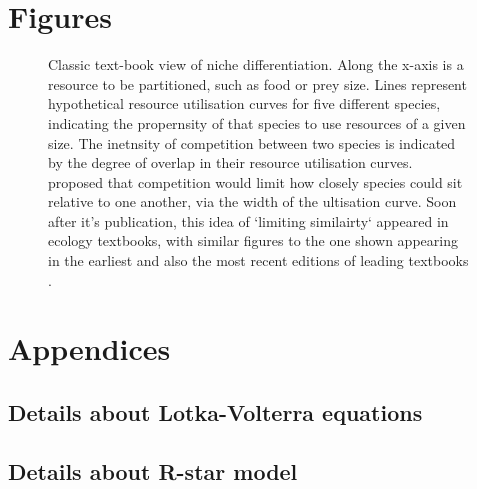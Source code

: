 \documentclass[a4paper,11pt]{article}
\begin{document}
\section{Figures}

\begin{figure}[h]
  \centering
  \caption{Classic text-book view of niche differentiation.
  Along the x-axis is a resource to be partitioned, such as food or prey size. Lines
  represent hypothetical resource utilisation curves for five different species,
  indicating the propernsity of that species to use resources of a given size.
  The inetnsity of competition between two species is indicated by the degree
  of overlap in their resource utilisation curves. \citet{MacArthur-1967} proposed
  that competition would limit how closely species could sit relative to one
  another, via the width of the ultisation curve. Soon after it's publication,
  this idea of `limiting similairty` appeared in ecology textbooks, with similar
  figures to the one shown appearing in the earliest and also the most recent
  editions of leading textbooks \citep{begon-1986, begon-2006, Krebs-1978, Krebs-2013,
  Ricklefs-1973, Ricklefs-1999}.}
  \label{fig:competition-kernels}
\end{figure}

\clearpage




\section{Appendices}

\subsection{Details about Lotka-Volterra equations}\label{LV}

\subsection{Details about R-star model}\label{Rstar}
\end{document}
